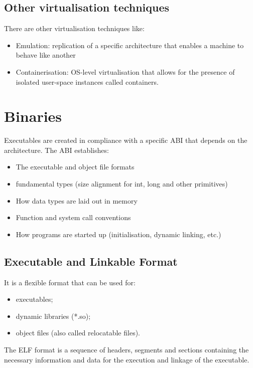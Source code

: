 \documentclass[paper=a4, fontsize=11pt]{report} %
\numberwithin{equation}{section} %
\numberwithin{figure}{section} %
\numberwithin{table}{section} %
\begin{document}
\subsection{Other virtualisation techniques}
There are other virtualisation techniques like:
\begin{itemize}
	\item Emulation: replication of a specific architecture that enables a 
	machine to behave like another
	\item Containerisation: OS-level virtualisation that allows for the 
	presence of isolated user-space instances called containers.
\end{itemize}
\section{Binaries}
Executables are created in compliance with a specific ABI that depends on the 
architecture. The ABI establishes:
\begin{itemize}
	\item The executable and object file formats
	\item fundamental types (size alignment for int, long and other primitives)
	\item How data types are laid out in memory
	\item Function and system call conventions
	\item How programs are started up (initialisation, dynamic linking, etc.)
\end{itemize}
\subsection{Executable and Linkable Format}
It is a flexible format that can be used for:
\begin{itemize}
	\item executables;
	\item dynamic libraries (*.so);
	\item object files (also called relocatable files).
\end{itemize}
The ELF format is a sequence of headers, segments and sections containing the
necessary information and data for the execution and linkage of the executable.
\end{document}
